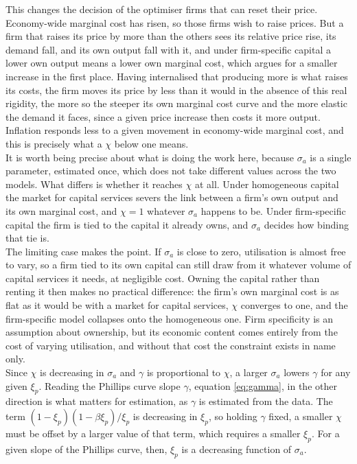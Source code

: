 \documentclass[12pt, a4paper]{article}
\begin{document}
This changes the decision of the optimiser firms that can reset their price. Economy-wide
marginal cost has risen, so those firms wish to raise prices. But a firm that raises its
price by more than the others sees its relative price rise, its demand fall, and its own
output fall with it, and under firm-specific capital a lower own output means a lower own
marginal cost, which argues for a smaller increase in the first place. Having internalised
that producing more is what raises its costs, the firm moves its price by less than it would
in the absence of this real rigidity, the more so the steeper its own marginal cost curve and
the more elastic the demand it faces, since a given price increase then costs it more output.
Inflation responds less to a given movement in economy-wide marginal cost, and this is
precisely what a $\chi$ below one means.
\\

It is worth being precise about what is doing the work here, because $\sigma_a$ is a single
parameter, estimated once, which does not take different values across the two models. What
differs is whether it reaches $\chi$ at all. Under homogeneous capital the market for capital
services severs the link between a firm's own output and its own marginal cost, and
$\chi = 1$ whatever $\sigma_a$ happens to be. Under firm-specific capital the firm is tied to
the capital it already owns, and $\sigma_a$ decides how binding that tie is.
\\

The limiting case makes the point. If $\sigma_a$ is close to zero, utilisation is almost free
to vary, so a firm tied to its own capital can still draw from it whatever volume of capital
services it needs, at negligible cost. Owning the capital rather than renting it then makes
no practical difference: the firm's own marginal cost is as flat as it would be with a market
for capital services, $\chi$ converges to one, and the firm-specific model collapses onto the
homogeneous one. Firm specificity is an assumption about ownership, but its economic content
comes entirely from the cost of varying utilisation, and without that cost the constraint
exists in name only.
\\

Since $\chi$ is decreasing in $\sigma_a$ and $\gamma$ is proportional to $\chi$, a larger $\sigma_a$
lowers $\gamma$ for any given $\xi_p$. Reading the Phillips curve slope $\gamma$, equation \eqref{eq:gamma}, 
in the other direction is what matters for estimation, as $\gamma$ is estimated from the data.
The term $(1-\xi_p)(1-\beta\xi_p)/\xi_p$ is decreasing in $\xi_p$, so holding $\gamma$ fixed, a smaller
$\chi$ must be offset by a larger value of that term, which requires a smaller $\xi_p$. For a
given slope of the Phillips curve, then, $\xi_p$ is a decreasing function of $\sigma_a$.
\\
\end{document}
